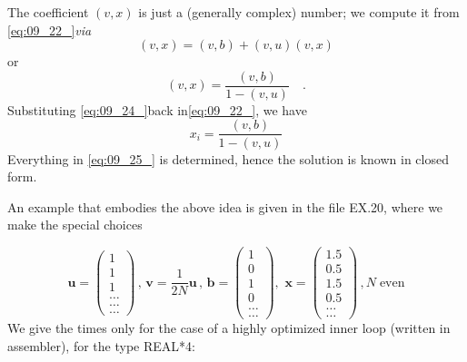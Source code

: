 The coefficient $(v, x)$ is just a (generally complex) number; we
compute it from \ref{eq:09_22_}\textit{via}
\begin{equation}
 \label{eq:09_23_}
    (v,x)=(v,b)+(v,u)(v,x)
\end{equation}
or
\begin{equation}
 \label{eq:09_24_}
    (v,x)=\frac{(v,b)}{1-(v,u)}\quad .
\end{equation}
Substituting \ref{eq:09_24_}back in\ref{eq:09_22_}, we have
\begin{equation}
 \label{eq:09_25_}
    x_i=\frac{(v,b)}{1-(v,u)}
\end{equation}
Everything in \ref{eq:09_25_} is determined, hence the solution is known in
closed form.

An example that embodies the above idea is given in the file
EX.20, where we make the special choices

\begin{equation*}
 \label{eq:09_25_}
    \mathbf{u}=
    \begin{pmatrix}
        1\\ 
        1\\ 
        1\\ 
        \dots\\ 
        \dots\\ 
        \dots
    \end{pmatrix}
    \, ,\, 
    \mathbf{v}=\frac{1}{2N} \mathbf{u}\, , \, 
    \mathbf{b} =
    \begin{pmatrix}
        1\\ 
        0\\ 
        1\\ 
        0\\ 
        \dots\\ 
        \dots
    \end{pmatrix}
    ,\, \,  
    \mathbf{x}=
    \begin{pmatrix}
        1.5\\ 
        0.5\\ 
        1.5\\ 
        0.5\\ 
        \dots\\ 
        \dots
    \end{pmatrix}
    \, , N \; \textrm{even}
\end{equation*}
We give the times only for the case of a highly optimized inner
loop (written in assembler), for the type REAL*4:

